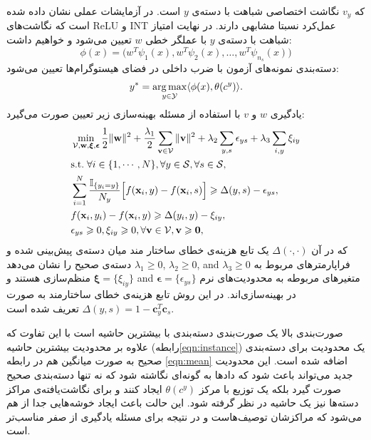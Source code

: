 که $v_y$ نگاشت اختصاصی شباهت با دسته‌ی $y$ است. در آزمایشات عملی نشان داده شده است که نگاشت‌های ReLU و INT عمل‌کرد نسبتا مشابهی دارند. در نهایت امتیاز شباهت با دسته‌ی $y$ با عملگر خطی $w$ تعیین می‌شود و خواهیم داشت:
\begin{equation}
    \phi(x) = \big (w^T\psi_1(x), w^T\psi_2(x), \ldots, w^T\psi_{n_s}(x) \big )
\end{equation}	
دسته‌بندی نمونه‌های آزمون با ضرب داخلی  در فضای هیستوگرام‌ها تعیین می‌شود:
\begin{equation}
y^* = \argmax_{y \in \mathcal{Y}} \langle \phi(x), \theta(c^y) \rangle.
\end{equation}
یادگیری $w$ و $v$ با استفاده از مسئله بهینه‌سازی زیر تعیین صورت می‌گیرد:
\begin{align}\label{eqn:sl}
&\min_{\mathcal{V}, \mathbf{w}, \boldsymbol{\xi}, \boldsymbol{\epsilon}}\frac{1}{2}\|\mathbf{w}\|^2+\frac{\lambda_1}{2}\sum_{\mathbf{v}\in\mathcal{V}}\|\mathbf{v}\|^2+\lambda_2\sum_{y,s}\epsilon_{ys}+\lambda_3\sum_{i,y}\xi_{iy}\\
&\mbox{s.t.} \; \forall i\in\{1,\cdots,N\}, \forall y\in\mathcal{S}, \forall s\in\mathcal{S}, \nonumber\\
&\sum_{i=1}^N {\mathbb{I}_{\{y_i=y\}} \over N_y}\Big[f(\mathbf{x}_i,y)-f(\mathbf{x}_i,s)\Big]\geq\Delta(y,s)-\epsilon_{ys}, \label{eqn:mean}\\
&  f(\mathbf{x}_i,y_i)-f(\mathbf{x}_i,y)\geq\Delta(y_i,y)-\xi_{iy}, \label{eqn:instance}\\
& \epsilon_{ys}\geq0, \xi_{iy}\geq0, \forall \mathbf{v}\in\mathcal{V}, \mathbf{v}\geq\mathbf{0},\nonumber
\end{align}
%
که در آن 
$\Delta(\cdot, \cdot)$
یک تابع هزینه‌ی خطای ساختار مند میان دسته‌ی پیش‌بینی شده و دسته‌ی صحیح را نشان می‌دهد 
  $\lambda_1\geq0$, $\lambda_2\geq0$, and $\lambda_3\geq0$
فراپارمترهای مربوط به منظم‌سازی هستند و 
   $\boldsymbol{\xi}=\{\xi_{iy}\}$ and $\boldsymbol{\epsilon}=\{\epsilon_{ys}\}$ 
متغیرهای مربوطه به محدودیت‌های نرم در بهینه‌سازی‌اند.
     در این روش تابع هزینه‌ی خطای ساختارمند  به صورت 
 $\Delta(y,s)=1-\mathbf{c}_{y}^T\mathbf{c}_{s}$
 تعریف شده است.
 
صورت‌بندی بالا یک صورت‌بندی دسته‌بندی با بیشترین حاشیه است با این تفاوت که علاوه بر محدودیت بیشترین حاشیه (رابطه\eqref{eqn:instance}) یک محدودیت برای دسته‌بندی صحیح به صورت میانگین هم در رابطه 
\eqref{eqn:mean}
اضافه شده است. این محدودیت جدید می‌تواند باعث شود که داد‌ها به گونه‌ای نگاشته شود که نه تنها دسته‌بندی صحیح صورت گیرد بلکه  یک توزیع با مرکز $\theta(c^y)$ ایجاد کنند و برای نگاشت‌یافته‌ی مراکز دسته‌ها نیز یک حاشیه در نظر گرفته شود. این حالت باعث ایجاد خوشه‌هایی جدا از هم می‌شود که مراکزشان توصیف‌هاست و در نتیجه برای مسئله یادگیری از صفر مناسب‌تر است.

